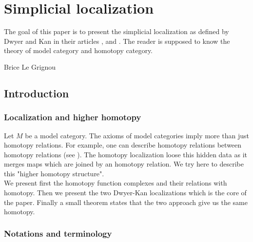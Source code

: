 \chapter{Simplicial localization}
\label{chapter:simplicial-localization}

\begin{refsection}

The goal of this paper is to present the simplicial localization as defined by Dwyer and Kan in their articles \cite{dksimplicial}, \cite{dkcomputing} and \cite{dkfunction}. The reader is supposed to know the theory of model category and homotopy category.

\begin{flushright}
Brice Le Grignou
\end{flushright}

\section{Introduction}

\subsection{Localization and higher homotopy}

Let $M$ be a model category. The axioms of model categories imply more than just homotopy relations. For example, one can describe homotopy relations between homotopy relations (see \cite[2.3]{fromHAtoHAG}). The homotopy localization loose this hidden data as it merges maps which are joined by an homotopy relation. We try here to describe this "higher homotopy structure".\\

We present first the homotopy function complexes and their relations with homotopy. Then we present the two Dwyer-Kan localizations which is the core of the paper. Finally a small theorem states that the two approach give us the same homotopy.

\subsection{Notations and terminology}


\end{refsection}
